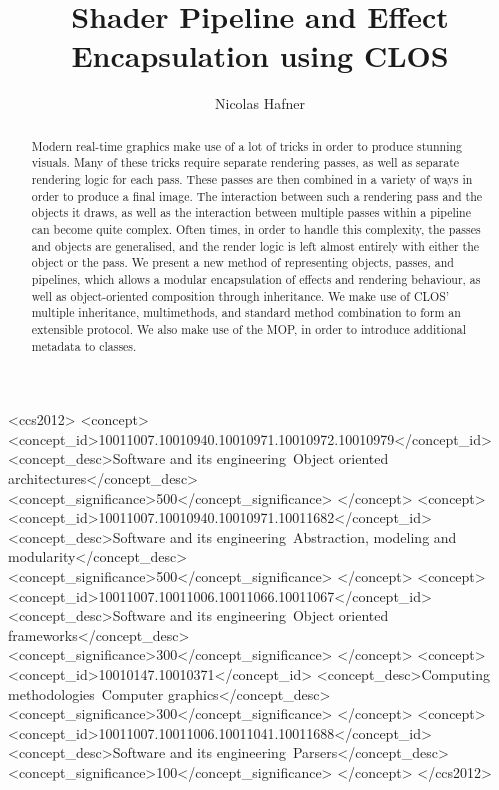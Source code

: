 \documentclass[format=sigconf]{acmart}
\begin{document}
\title{Shader Pipeline and Effect Encapsulation using CLOS}

\author{Nicolas Hafner}

\begin{abstract}
  Modern real-time graphics make use of a lot of tricks in order to produce stunning visuals. Many of these tricks require separate rendering passes, as well as separate rendering logic for each pass. These passes are then combined in a variety of ways in order to produce a final image. The interaction between such a rendering pass and the objects it draws, as well as the interaction between multiple passes within a pipeline can become quite complex. Often times, in order to handle this complexity, the passes and objects are generalised, and the render logic is left almost entirely with either the object or the pass. We present a new method of representing objects, passes, and pipelines, which allows a modular encapsulation of effects and rendering behaviour, as well as object-oriented composition through inheritance. We make use of CLOS' multiple inheritance, multimethods, and standard method combination to form an extensible protocol. We also make use of the MOP, in order to introduce additional metadata to classes.
\end{abstract}

\begin{CCSXML}
  <ccs2012>
  <concept>
  <concept_id>10011007.10010940.10010971.10010972.10010979</concept_id>
  <concept_desc>Software and its engineering~Object oriented architectures</concept_desc>
  <concept_significance>500</concept_significance>
  </concept>
  <concept>
  <concept_id>10011007.10010940.10010971.10011682</concept_id>
  <concept_desc>Software and its engineering~Abstraction, modeling and modularity</concept_desc>
  <concept_significance>500</concept_significance>
  </concept>
  <concept>
  <concept_id>10011007.10011006.10011066.10011067</concept_id>
  <concept_desc>Software and its engineering~Object oriented frameworks</concept_desc>
  <concept_significance>300</concept_significance>
  </concept>
  <concept>
  <concept_id>10010147.10010371</concept_id>
  <concept_desc>Computing methodologies~Computer graphics</concept_desc>
  <concept_significance>300</concept_significance>
  </concept>
  <concept>
  <concept_id>10011007.10011006.10011041.10011688</concept_id>
  <concept_desc>Software and its engineering~Parsers</concept_desc>
  <concept_significance>100</concept_significance>
  </concept>
  </ccs2012>
\end{CCSXML}
\end{document}

